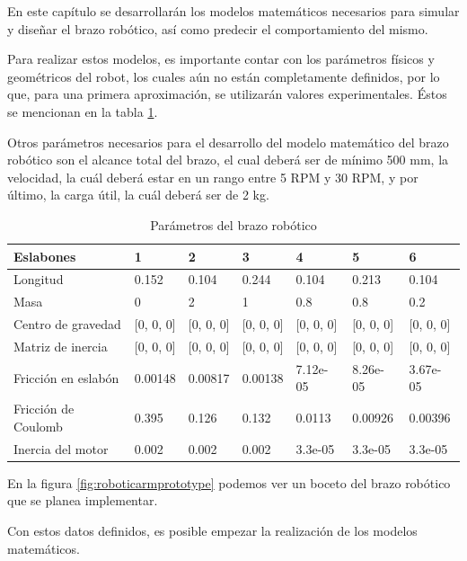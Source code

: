 En este capítulo se desarrollarán los modelos matemáticos necesarios para simular y diseñar el brazo robótico, así como predecir el comportamiento del mismo.

Para realizar estos modelos, es importante contar con los parámetros físicos y geométricos del robot, los cuales aún no están completamente definidos, por lo que, para una primera aproximación, se utilizarán valores experimentales. Éstos se mencionan en la tabla \ref{table:parametrosbrazorobotico}.

Otros parámetros necesarios para el desarrollo del modelo matemático del brazo robótico son el alcance total del brazo, el cual deberá ser de mínimo 500 mm, la velocidad, la cuál deberá estar en un rango entre 5 RPM y 30 RPM, y por último, la carga útil, la cuál deberá ser de 2 kg.

\begin{table}
\centering
\caption{Parámetros del brazo robótico}
 \label{table:parametrosbrazorobotico}
\begin{tabular}{l|l|l|l|l|l|l|}
\textbf{Eslabones}                       &  1   &  2   &  3   &  4   &  5   &  6    \\ 
\hline
Longitud           & 0.152       & 0.104       & 0.244       & 0.104       & 0.213       & 0.104        \\
Masa               & 0           & 2           & 1           & 0.8         & 0.8         & 0.2          \\
Centro de gravedad & {[}0, 0, 0] & {[}0, 0, 0] & {[}0, 0, 0] & {[}0, 0, 0] & {[}0, 0, 0] & {[}0, 0, 0]  \\
Matriz de inercia      & {[}0, 0, 0] & {[}0, 0, 0] & {[}0, 0, 0] & {[}0, 0, 0] & {[}0, 0, 0] & {[}0, 0, 0]  \\
Fricción en eslabón    & 0.00148     & 0.00817     & 0.00138     & 7.12e-05    & 8.26e-05    & 3.67e-05     \\
Fricción de Coulomb    & 0.395       & 0.126       & 0.132       & 0.0113      & 0.00926     & 0.00396      \\
Inercia del motor      & 0.002       & 0.002       & 0.002       & 3.3e-05     & 3.3e-05     & 3.3e-05     
\end{tabular}
\end{table}

En la figura \ref{fig:roboticarmprototype} podemos ver un boceto del brazo robótico que se planea implementar.

Con estos datos definidos, es posible empezar la realización de los modelos matemáticos.

